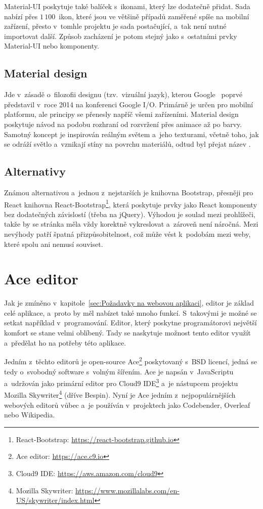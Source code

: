 Material-UI poskytuje také balíček s~ikonami, který lze dodatečně přidat. Sada nabízí přes $1\,100$~ikon, které jsou ve většině případů zaměřené spíše na mobilní zařízení, přesto v~tomhle projektu je sada postačující, a~tak není nutné importovat další. Způsob zacházení je potom stejný jako s~ostatními prvky Material-UI nebo komponenty.

\subsection*{Material design}
Jde v~zásadě o~filozofii designu (tzv.~vizuální jazyk), kterou Google~\cite{book:MaterialDesign} poprvé představil v~roce 2014 na konferenci Google I/O. Primárně je určen pro mobilní platformu, ale principy se přenesly napříč všemi zařízeními. Material design poskytuje návod na podobu rozhraní od rozvržení přes animace až po barvy. Samotný koncept je inspirován reálným světem a~jeho texturami, včetně toho, jak se odráží světlo a~vznikají stíny na povrchu materiálů, odtud byl přejat název .

\subsection*{Alternativy}
Známou alternativou a~jednou z~nejstarších je knihovna Bootstrap, přesněji pro React knihovna React-Bootstrap\footnote{React-Bootstrap: \url{https://react-bootstrap.github.io}}, která poskytuje prvky jako React komponenty bez dodatečných závislostí (třeba na jQuery). Výhodou je soulad mezi prohlížeči, takže by se stránka měla vždy korektně vykreslovat a~zároveň není náročná. Mezi nevýhody patří špatná přizpůsobitelnost, což může vést k~podobám mezi weby, které spolu ani nemusí souviset.

\section{Ace editor}
Jak je zmíněno v~kapitole~\ref{sec:Požadavky na webovou aplikaci}, editor je základ celé aplikace, a~proto by měl nabízet také mnoho funkcí. S~takovými je možné se setkat například v~programování. Editor, který poskytne programátorovi největší komfort se stane velmi oblíbený. Tady se naskytuje možnost tento editor využít a~předělat ho na potřeby této aplikace.

Jedním z~těchto editorů je open-source Ace\footnote{Ace editor: \url{https://ace.c9.io}} poskytovaný s~BSD licencí, jedná se tedy o~svobodný software s~volným šířením. Ace je napsán v~JavaScriptu a~udržován jako primární editor pro Cloud9 IDE\footnote{Cloud9 IDE: \url{https://aws.amazon.com/cloud9}} a~je nástupcem projektu Mozilla Skywriter\footnote{Mozilla Skywriter: \url{https://www.mozillalabs.com/en-US/skywriter/index.html}} (dříve Bespin). Nyní je Ace jedním z~nejpopulárnějších webových editorů vůbec a~je používán v~projektech jako Codebender, Overleaf nebo Wikipedia.

